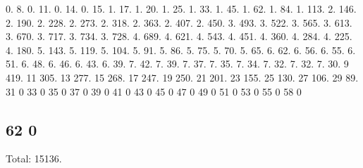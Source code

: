 0. 8. 0. 11. 0. 14. 0. 15. 1. 17. 1. 20. 1. 25. 1. 33. 1. 45. 1. 62. 1. 84. 1. 113. 2. 146. 2. 190. 2. 228. 2. 273. 2. 318. 2. 363. 2. 407. 2. 450. 3. 493. 3. 522. 3. 565. 3. 613. 3. 670. 3. 717. 3. 734. 3. 728. 4. 689. 4. 621. 4. 543. 4. 451. 4. 360. 4. 284. 4. 225. 4. 180. 5. 143. 5. 119. 5. 104. 5. 91. 5. 86. 5. 75. 5. 70. 5. 65. 6. 62. 6. 56. 6. 55. 6. 51. 6. 48. 6. 46. 6. 43. 6. 39. 7. 42. 7. 39. 7. 37. 7. 35. 7. 34. 7. 32. 7. 32. 7. 30. 9 419. 11 305. 13 277. 15 268. 17 247. 19 250. 21 201. 23 155. 25 130. 27 106. 29 89. 31 0 33 0 35 0 37 0 39 0 41 0 43 0 45 0 47 0 49 0 51 0 53 0 55 0 58 0 \subsection*{62 0 }

Total\+: 15136. 